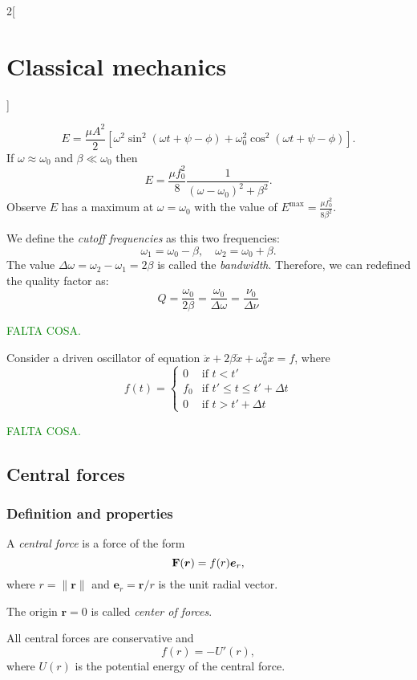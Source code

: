 \documentclass[../../../main.tex]{subfiles}
\begin{document}
\begin{multicols}{2}[\section{Classical mechanics}]
\begin{prop}
    \end{prop}
    \begin{prop}
        $$E=\frac{\mu A^2}{2}\left[\omega^2\sin^2(\omega t+\psi-\phi)+\omega_0^2\cos^2(\omega t+\psi-\phi)\right].$$ If $\omega\approx\omega_0$ and $\beta\ll\omega_0$ then $$E=\frac{\mu f_0^2}{8}\frac{1}{(\omega-\omega_0)^2+\beta^2}.$$ Observe $E$ has a maximum at $\omega=\omega_0$ with the value of $E^\text{max}=\frac{\mu f_0^2}{8\beta^2}$.
    \end{prop}
    \begin{definition}
        We define the \textit{cutoff frequencies} as this two frequencies: $$\omega_1=\omega_0-\beta,\quad\omega_2=\omega_0+\beta.$$ The value  $\Delta\omega=\omega_2-\omega_1=2\beta$ is called the \textit{bandwidth}. Therefore, we can redefined the quality factor as: $$Q=\frac{\omega_0}{2\beta}=\frac{\omega_0}{\Delta\omega}=\frac{\nu_0}{\Delta\nu}$$
    \end{definition}
    \textcolor{green}{FALTA COSA.}
    \begin{prop}
        Consider a driven oscillator of equation $\ddot{x}+2\beta\dot{x}+\omega_0^2x=f$, where $$f(t)=\left\{
            \begin{array}{cc}
                0   & \text{if } t<t'                    \\
                f_0 & \text{if }t'\leq t\leq t'+\Delta t \\
                0   & \text{if } t>t'+\Delta t
            \end{array}\right.$$
    \end{prop}
    \textcolor{green}{FALTA COSA.}
    \subsection{Central forces}
    \subsubsection*{Definition and properties}
    \begin{definition}
        A \textit{central force} is a force of the form $$\vb{F}(\boldsymbol{r})=f(r)\boldsymbol{e}_r,$$ where $r=\|\boldsymbol{r}\|$ and $\boldsymbol{e}_r=\boldsymbol{r}/r$ is the unit radial vector.
    \end{definition}
    \begin{definition}
        The origin $\boldsymbol{r}=0$ is called \textit{center of forces}.
    \end{definition}
    \begin{prop}
        All central forces are conservative and $$f(r)=-U'(r),$$ where $U(r)$ is the potential energy of the central force.
    \end{prop}

\end{multicols}
\end{document}
